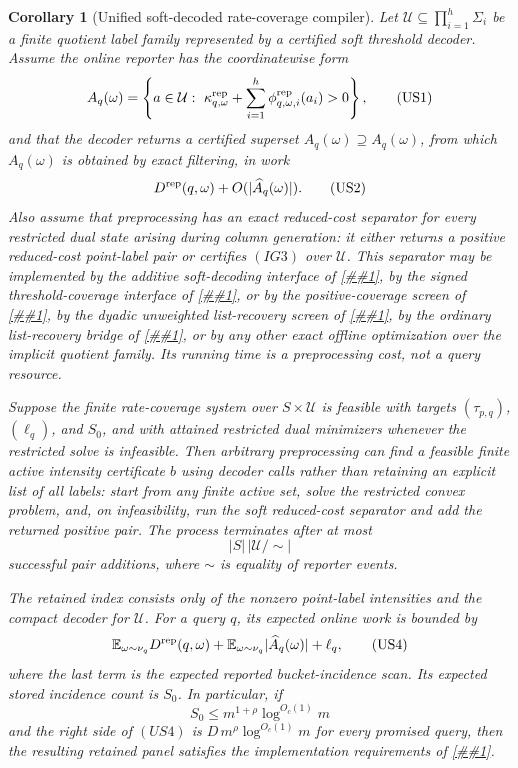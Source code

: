 \documentclass[10pt]{article}
\newcommand{\cref}[1]{\ref{##1}}
\newtheorem{corollary}[theorem]{Corollary}
\theoremstyle{definition}
\newcommand{\E}{\mathbb{E}}
\begin{document}
\begin{corollary}[Unified soft-decoded rate-coverage compiler]
   \label{cor:unified-soft-decoded-rate-coverage}
   Let \(\mathcal U\subseteq\prod_{i=1}^h\Sigma_i\) be a finite quotient label
   family represented by a certified soft threshold decoder.  Assume the online
   reporter has the coordinatewise form
   \[
      A_q(\omega)
      =
      \left\{
      a\in\mathcal U:\
      \kappa^{\rm rep}_{q,\omega}
      +\sum_{i=1}^h\phi^{\rm rep}_{q,\omega,i}(a_i)>0
      \right\},
      \tag{US1}
   \]
   and that the decoder returns a certified superset
   \(\widehat A_q(\omega)\supseteq A_q(\omega)\), from which \(A_q(\omega)\)
   is obtained by exact filtering, in work
   \[
      D^{\rm rep}(q,\omega)+O(|\widehat A_q(\omega)|).
      \tag{US2}
   \]
   Also assume that preprocessing has an exact reduced-cost separator for every
   restricted dual state arising during column generation: it either returns a
   positive reduced-cost point-label pair or certifies \((IG3)\) over
   \(\mathcal U\).  This separator may be implemented by the additive
   soft-decoding interface of
   \cref{cor:soft-list-decoding-reduced-cost-separator}, by the signed
   threshold-coverage interface of \cref{cor:threshold-event-reduced-cost}, or
   by the positive-coverage screen of
   \cref{cor:positive-coverage-screen}, by the dyadic unweighted
   list-recovery screen of \cref{cor:dyadic-positive-list-recovery}, by the
   ordinary list-recovery bridge of
   \cref{cor:ordinary-list-recovery-positive-coverage}, or by any
   other exact offline optimization over the implicit quotient family.
   Its running time is a preprocessing cost, not a query resource.

   Suppose the finite rate-coverage system over \(S\times\mathcal U\) is
   feasible with targets \((\tau_{p,q})\), \((\ell_q)\), and \(S_0\), and with
   attained restricted dual minimizers whenever the restricted solve is
   infeasible.  Then arbitrary preprocessing can find a feasible finite active
   intensity certificate \(b\) using decoder calls rather than retaining an
   explicit list of all labels: start from any finite active set, solve the
   restricted convex problem, and, on infeasibility, run the soft reduced-cost
   separator and add the returned positive pair.  The process terminates after at most
   \[
      |S|\,|\mathcal U/{\sim}|
      \tag{US3}
   \]
   successful pair additions, where \(\sim\) is equality of reporter events.

   The retained index consists only of the nonzero point-label intensities and
   the compact decoder for \(\mathcal U\).  For a query \(q\), its expected
   online work is bounded by
   \[
      \E_{\omega\sim\nu_q}D^{\rm rep}(q,\omega)
      +
      \E_{\omega\sim\nu_q}|\widehat A_q(\omega)|
      +
      \ell_q ,
      \tag{US4}
   \]
   where the last term is the expected reported bucket-incidence scan.  Its
   expected stored incidence count is \(S_0\).  In particular, if
   \[
      S_0\le m^{1+\rho}\log^{O_c(1)}m
      \tag{US5}
   \]
   and the right side of \((US4)\) is
   \(D\,m^\rho\log^{O_c(1)}m\) for every promised query, then the resulting
   retained panel satisfies the implementation requirements of
   \cref{asm:rate-coverage-panel}.
\end{corollary}
\end{document}
